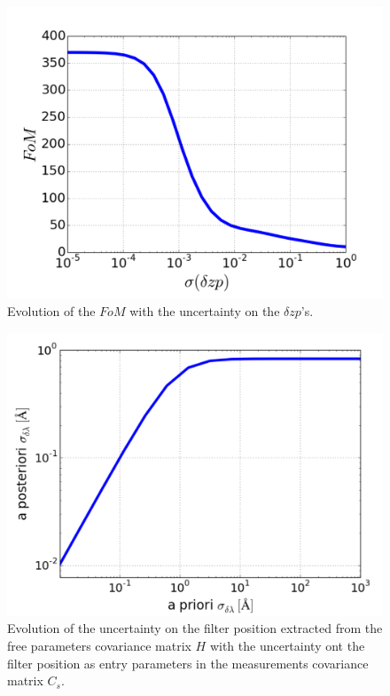 \documentclass[\docopts]{\docclass}
\begin{document}
\begin{figure}[ht]
  \centering
  \includegraphics[width=\linewidth]{FoM_20k.pdf}
  \caption{Evolution of the $FoM$ with the uncertainty on the $\delta zp$'s.}
  \label{fig:fom_zp}
\end{figure}

\begin{figure}[ht]
  \centering
  \includegraphics[width=\linewidth]{a_posteriori_sigmas.pdf}
  \caption{Evolution of the uncertainty on the filter position extracted from the free parameters covariance matrix $H$ with the uncertainty ont the filter position as entry parameters in the measurements covariance matrix $C_s$.}
  \label{fig:delta_lambda_ev}
\end{figure}
\end{document}
